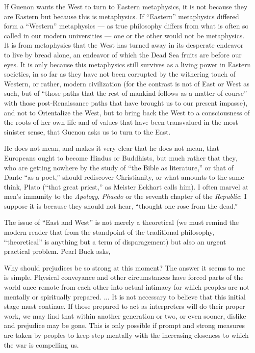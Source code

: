If Guenon wants the West to turn to Eastern metaphysics, it is not because they are Eastern but because this is metaphysics. If ``Eastern'' metaphysics differed form a ``Western'' metaphysics --- as true philosophy differs from what is often so called in our modern universities --- one or the other would not be metaphysics. It is from metaphysics that the West has turned away in its desperate endeavor to live by bread alone, an endeavor of which the Dead Sea fruits are before our eyes. It is only because this metaphysics still survives as a living power in Eastern societies, in so far as they have not been corrupted by the withering touch of Western, or rather, modern civilization (for the contrast is not of East or West as such, but of ``those paths that the rest of mankind follows as a matter of course'' with those post-Renaissance paths that have brought us to our present impasse), and not to Orientalize the West, but to bring back the West to a consciousness of the roots of her own life and of values that have been transvalued in the most sinister sense, that Guenon asks us to turn to the East.

He does not mean, and makes it very clear that he does not mean, that Europeans ought to become Hindus or Buddhists, but much rather that they, who are getting nowhere by the study of ``the Bible as literature,'' or that of Dante ``as a poet,'' should rediscover Christianity, or what amounts to the same think, Plato (``that great priest,'' as Meister Eckhart calls him). I often marvel at men's immunity to the \emph{Apology}, \emph{Phaedo} or the seventh chapter of the \emph{Republic}; I suppose it is because they should not hear, ``thought one rose from the dead.''

The issue of ``East and West'' is not merely a theoretical (we must remind the modern reader that from the standpoint of the traditional philosophy, ``theoretical'' is anything but a term of disparagement) but also an urgent practical problem. Pearl Buck asks,

\begin{quotex}
Why should prejudices be so strong at this moment? The answer it seems to me is simple. Physical conveyance and other circumstances have forced parts of the world once remote from each other into actual intimacy for which peoples are not mentally or spiritually prepared. ... It is not necessary to believe that this initial stage must continue. If those prepared to act as interpreters will do their proper work, we may find that within another generation or two, or even sooner, dislike and prejudice may be gone. This is only possible if prompt and strong measures are taken by peoples to keep step mentally with the increasing closeness to which the war is compelling us.
\end{quotex}


